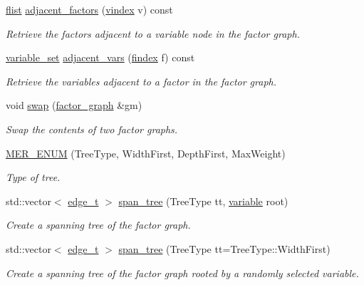 \begin{DoxyCompactItemize}
\hyperlink{classmerlin_1_1factor__graph_a48dec4ea8a655315053984a81fe93ebc}{flist} \hyperlink{classmerlin_1_1factor__graph_acad131cfcb6750093683128ab7171523}{adjacent\+\_\+factors} (\hyperlink{classmerlin_1_1factor__graph_a6b8a8220d86d6a6f91a8d2c7dd00ddc9}{vindex} v) const 
\begin{DoxyCompactList}\small\item\em Retrieve the factors adjacent to a variable node in the factor graph. \end{DoxyCompactList}\item 
\hyperlink{classmerlin_1_1variable__set}{variable\+\_\+set} \hyperlink{classmerlin_1_1factor__graph_a84f3800e16143f385dd14afedd7d49ef}{adjacent\+\_\+vars} (\hyperlink{classmerlin_1_1factor__graph_a533556bd4ec6961b63a91a80a8a37508}{findex} f) const 
\begin{DoxyCompactList}\small\item\em Retrieve the variables adjacent to a factor in the factor graph. \end{DoxyCompactList}\item 
void \hyperlink{classmerlin_1_1factor__graph_a5cdf18711449fed75507d80bbfe549fb}{swap} (\hyperlink{classmerlin_1_1factor__graph}{factor\+\_\+graph} \&gm)
\begin{DoxyCompactList}\small\item\em Swap the contents of two factor graphs. \end{DoxyCompactList}\item 
\hyperlink{classmerlin_1_1factor__graph_ae9d805687c0de6a98a423b12987d0847}{M\+E\+R\+\_\+\+E\+N\+UM} (Tree\+Type, Width\+First, Depth\+First, Max\+Weight)\hypertarget{classmerlin_1_1factor__graph_ae9d805687c0de6a98a423b12987d0847}{}\label{classmerlin_1_1factor__graph_ae9d805687c0de6a98a423b12987d0847}

\begin{DoxyCompactList}\small\item\em Type of tree. \end{DoxyCompactList}\item 
std\+::vector$<$ \hyperlink{namespacemerlin_a44eb24328668c9618f20915763bd3192}{edge\+\_\+t} $>$ \hyperlink{classmerlin_1_1factor__graph_a15aa43072a0d40884957b7053106d5fb}{span\+\_\+tree} (Tree\+Type tt, \hyperlink{classmerlin_1_1variable}{variable} root)
\begin{DoxyCompactList}\small\item\em Create a spanning tree of the factor graph. \end{DoxyCompactList}\item 
std\+::vector$<$ \hyperlink{namespacemerlin_a44eb24328668c9618f20915763bd3192}{edge\+\_\+t} $>$ \hyperlink{classmerlin_1_1factor__graph_add951d3edd3613808615b87fa2201904}{span\+\_\+tree} (Tree\+Type tt=Tree\+Type\+::\+Width\+First)
\begin{DoxyCompactList}\small\item\em Create a spanning tree of the factor graph rooted by a randomly selected variable. \end{DoxyCompactList}\end{DoxyCompactItemize}
